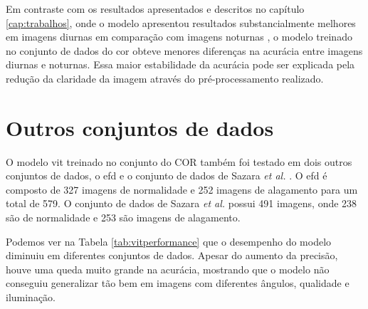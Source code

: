 
Em contraste com os resultados apresentados e descritos no capítulo \ref{cap:trabalhos}, 
onde o modelo apresentou resultados substancialmente melhores em imagens diurnas em comparação com imagens noturnas \cite{piedad2022},
o modelo treinado no conjunto de dados do \acrshort{cor} obteve menores diferenças na acurácia entre imagens diurnas e noturnas.
Essa maior estabilidade da acurácia pode ser explicada pela redução da claridade da imagem através do pré-processamento realizado.
\section{Outros conjuntos de dados}\label{sec:resultados_outros}

O modelo \acrshort{vit} treinado no conjunto do COR também foi testado em dois outros conjuntos de dados, 
o \acrfull{efd} \cite{BarzSchroeterMuench2018_1000117723} e o conjunto de dados de Sazara \textit{et al.} \cite{sazara2019}.
O \acrshort{efd} é composto de 327 imagens de normalidade e 252 imagens de alagamento para um total de 579.
O conjunto de dados de Sazara \textit{et al.} possui 491 imagens, onde 238 são de normalidade e 253 são imagens de alagamento.

Podemos ver na Tabela \ref{tab:vitperformance} que o desempenho do modelo diminuiu em diferentes conjuntos de dados. 
Apesar do aumento da precisão, houve uma queda muito grande na acurácia, mostrando que o modelo não conseguiu generalizar tão bem em imagens com diferentes ângulos, qualidade e iluminação.

